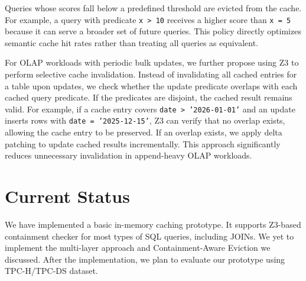 \documentclass[12pt]{article}
\begin{document}
Queries whose scores fall below a predefined threshold are evicted from the cache. For example, a query with predicate \texttt{x > 10} receives a higher score than \texttt{x = 5} because it can serve a broader set of future queries. This policy directly optimizes semantic cache hit rates rather than treating all queries as equivalent.

For OLAP workloads with periodic bulk updates, we further propose using Z3 to perform selective cache invalidation. Instead of invalidating all cached entries for a table upon updates, we check whether the update predicate overlaps with each cached query predicate. If the predicates are disjoint, the cached result remains valid. For example, if a cache entry covers \texttt{date > '2026-01-01'} and an update inserts rows with \texttt{date = '2025-12-15'}, Z3 can verify that no overlap exists, allowing the cache entry to be preserved. If an overlap exists, we apply delta patching to update cached results incrementally. This approach significantly reduces unnecessary invalidation in append-heavy OLAP workloads.

\section{Current Status}

We have implemented a basic in-memory caching prototype. It supports Z3-based containment checker for most types of SQL queries, including JOINs. We yet to implement the multi-layer approach and Containment-Aware Eviction we discussed. After the implementation, we plan to evaluate our prototype using TPC-H/TPC-DS dataset.
\end{document}
